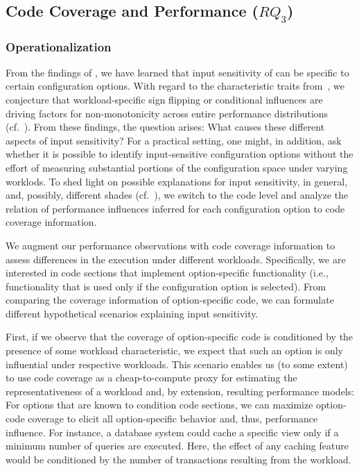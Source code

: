 {
\subsection{Code Coverage and Performance ($RQ_3$)}\label{sec:rq3}\label{sec:categories}
\subsubsection{Operationalization} From the findings of , we have learned that input sensitivity of can be specific to certain configuration options. With regard to the characteristic traits from~, we conjecture that workload-specific sign flipping or conditional influences are driving factors for non-monotonicity across entire performance distributions (cf.~). From these findings, the question arises: What causes these different aspects of input sensitivity? For a practical setting, one might, in addition, ask whether it is possible to identify input-sensitive configuration options without the effort of measuring substantial portions of the configuration space under varying worklods.
To shed light on possible explanations for input sensitivity, in general, and, possibly, different shades (cf.~), we switch to the code level and analyze the relation of performance influences inferred for each configuration option to code coverage information. 

We augment our performance observations with code coverage information to assess differences in the execution under different workloads. Specifically, we are interested in code sections that implement option-specific functionality (i.e., functionality that is used only if the configuration option is selected). From comparing the coverage information of option-specific code, we can formulate different hypothetical scenarios explaining input sensitivity. 

First, if we observe that the  coverage of option-specific code is conditioned by the presence of some workload characteristic, we expect that such an option is only influential under respective workloads. This scenario enables us (to some extent) to use code coverage as a cheap-to-compute proxy for estimating the representativeness of a workload and, by extension, resulting performance models: For options that are known to condition code sections, we can maximize option-code coverage to elicit all option-specific behavior and, thus, performance influence. For instance, a database system could cache a specific view only if a minimum number of queries are executed. Here, the effect of any caching feature would be conditioned by the number of transactions resulting from the workload.

}

